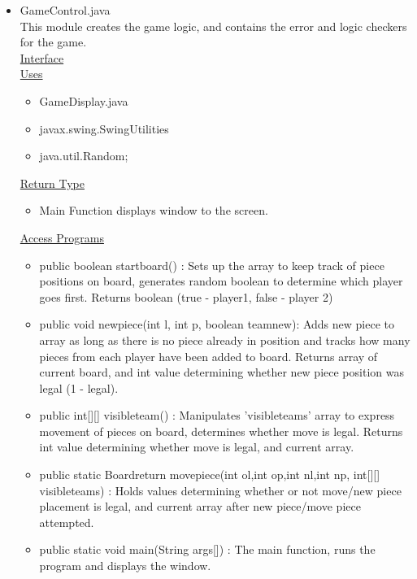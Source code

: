 \documentclass[12pt]{article}
\begin{document}
\begin{itemize}
				\item GameControl.java \\
				This module creates the game logic, and contains the error and logic checkers for the game. \\
				\underline{Interface} \\
				\underline{Uses}
				\begin{itemize}
					\item GameDisplay.java
					\item javax.swing.SwingUtilities
					\item java.util.Random;
				\end{itemize} 
				\underline{Return Type}
				\begin{itemize}
					\item Main Function displays window to the screen.
				\end{itemize}
				\underline{Access Programs}
				\begin{itemize}
					\item public boolean startboard() : Sets up the array to keep track of piece positions on board, generates random boolean to determine which player goes first. Returns boolean (true - player1, false - player 2)
					\item public void newpiece(int l, int p, boolean teamnew): Adds new piece to array as long as there is no piece already in position and tracks how many pieces from each player have been added to board. Returns array of current board, and int value determining whether new piece position was legal (1 - legal).
					\item public int[][] visibleteam() : Manipulates 'visibleteams' array to express movement of pieces on board, determines whether move is legal. Returns int value determining whether move is legal, and current array.
					\item public static Boardreturn movepiece(int ol,int op,int nl,int np, int[][] visibleteams) : Holds values determining whether or not move/new piece placement is legal, and current array after new piece/move piece attempted. 
					\item public static void main(String args[]) : The main function, runs the program and displays the window.
					


\end{itemize}
\end{itemize}
\end{document}
